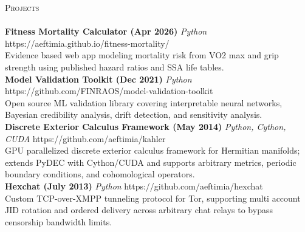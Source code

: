 \documentclass[a4paper]{article}
\newcommand{\lineunder} {
    \vspace*{-8pt} \\
    \hspace*{-18pt} \hrulefill \\
}
\newcommand{\header} [1] {
    {\hspace*{-18pt}\vspace*{6pt} \textsc{#1}}
    \vspace*{-6pt} \lineunder
}
\begin{document}
\header{Projects}
{\textbf{Fitness Mortality Calculator (Apr 2026)}} {\sl Python} \hfill https://aeftimia.github.io/fitness-mortality/\\
Evidence based web app modeling mortality risk from VO2 max and grip strength using published hazard ratios and SSA life tables.\\
\vspace*{2mm}
{\textbf{Model Validation Toolkit (Dec 2021)}} {\sl Python} \hfill https://github.com/FINRAOS/model-validation-toolkit\\
Open source ML validation library covering interpretable neural networks, Bayesian credibility analysis, drift detection, and sensitivity analysis.\\
\vspace*{2mm}
{\textbf{Discrete Exterior Calculus Framework (May 2014)}} {\sl Python, Cython, CUDA} \hfill https://github.com/aeftimia/kahler\\
GPU parallelized discrete exterior calculus framework for Hermitian manifolds; extends PyDEC with Cython/CUDA and supports arbitrary metrics, periodic boundary conditions, and cohomological operators.\\
\vspace*{2mm}
{\textbf{Hexchat (July 2013)}} {\sl Python} \hfill https://github.com/aeftimia/hexchat\\
Custom TCP-over-XMPP tunneling protocol for Tor, supporting multi account JID rotation and ordered delivery across arbitrary chat relays to bypass censorship bandwidth limits.\\
\vspace*{2mm}
\end{document}
